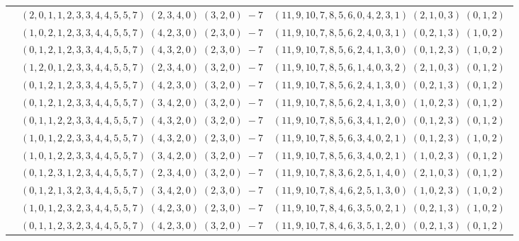 \documentclass[11pt]{article}
\begin{document}
\begin{longtable}[l]{|c|c|c|}
 \cline{2-3} 
 & $(2 ,0 ,1 ,1 ,2 ,3 ,3 ,4 ,4 ,5 ,5 ,7) \;(2 ,3 ,4 ,0) \;(3 ,2 ,0) \;-7$ & $(11 ,9 ,10 ,7 ,8 ,5 ,6 ,0 ,4 ,2 ,3 ,1) \;(2 ,1 ,0 ,3) \;(0 ,1 ,2) \;$\\ 
 \cline{2-3} 
 & $(1 ,0 ,2 ,1 ,2 ,3 ,3 ,4 ,4 ,5 ,5 ,7) \;(4 ,2 ,3 ,0) \;(2 ,3 ,0) \;-7$ & $(11 ,9 ,10 ,7 ,8 ,5 ,6 ,2 ,4 ,0 ,3 ,1) \;(0 ,2 ,1 ,3) \;(1 ,0 ,2) \;$\\ 
 \cline{2-3} 
 & $(0 ,1 ,2 ,1 ,2 ,3 ,3 ,4 ,4 ,5 ,5 ,7) \;(4 ,3 ,2 ,0) \;(2 ,3 ,0) \;-7$ & $(11 ,9 ,10 ,7 ,8 ,5 ,6 ,2 ,4 ,1 ,3 ,0) \;(0 ,1 ,2 ,3) \;(1 ,0 ,2) \;$\\ 
 \cline{2-3} 
 & $(1 ,2 ,0 ,1 ,2 ,3 ,3 ,4 ,4 ,5 ,5 ,7) \;(2 ,3 ,4 ,0) \;(3 ,2 ,0) \;-7$ & $(11 ,9 ,10 ,7 ,8 ,5 ,6 ,1 ,4 ,0 ,3 ,2) \;(2 ,1 ,0 ,3) \;(0 ,1 ,2) \;$\\ 
 \cline{2-3} 
 & $(0 ,1 ,2 ,1 ,2 ,3 ,3 ,4 ,4 ,5 ,5 ,7) \;(4 ,2 ,3 ,0) \;(3 ,2 ,0) \;-7$ & $(11 ,9 ,10 ,7 ,8 ,5 ,6 ,2 ,4 ,1 ,3 ,0) \;(0 ,2 ,1 ,3) \;(0 ,1 ,2) \;$\\ 
 \cline{2-3} 
 & $(0 ,1 ,2 ,1 ,2 ,3 ,3 ,4 ,4 ,5 ,5 ,7) \;(3 ,4 ,2 ,0) \;(3 ,2 ,0) \;-7$ & $(11 ,9 ,10 ,7 ,8 ,5 ,6 ,2 ,4 ,1 ,3 ,0) \;(1 ,0 ,2 ,3) \;(0 ,1 ,2) \;$\\ 
 \cline{2-3} 
 & $(0 ,1 ,1 ,2 ,2 ,3 ,3 ,4 ,4 ,5 ,5 ,7) \;(4 ,3 ,2 ,0) \;(3 ,2 ,0) \;-7$ & $(11 ,9 ,10 ,7 ,8 ,5 ,6 ,3 ,4 ,1 ,2 ,0) \;(0 ,1 ,2 ,3) \;(0 ,1 ,2) \;$\\ 
 \cline{2-3} 
 & $(1 ,0 ,1 ,2 ,2 ,3 ,3 ,4 ,4 ,5 ,5 ,7) \;(4 ,3 ,2 ,0) \;(2 ,3 ,0) \;-7$ & $(11 ,9 ,10 ,7 ,8 ,5 ,6 ,3 ,4 ,0 ,2 ,1) \;(0 ,1 ,2 ,3) \;(1 ,0 ,2) \;$\\ 
 \cline{2-3} 
 & $(1 ,0 ,1 ,2 ,2 ,3 ,3 ,4 ,4 ,5 ,5 ,7) \;(3 ,4 ,2 ,0) \;(3 ,2 ,0) \;-7$ & $(11 ,9 ,10 ,7 ,8 ,5 ,6 ,3 ,4 ,0 ,2 ,1) \;(1 ,0 ,2 ,3) \;(0 ,1 ,2) \;$\\ 
 \cline{2-3} 
 & $(0 ,1 ,2 ,3 ,1 ,2 ,3 ,4 ,4 ,5 ,5 ,7) \;(2 ,3 ,4 ,0) \;(3 ,2 ,0) \;-7$ & $(11 ,9 ,10 ,7 ,8 ,3 ,6 ,2 ,5 ,1 ,4 ,0) \;(2 ,1 ,0 ,3) \;(0 ,1 ,2) \;$\\ 
 \cline{2-3} 
 & $(0 ,1 ,2 ,1 ,3 ,2 ,3 ,4 ,4 ,5 ,5 ,7) \;(3 ,4 ,2 ,0) \;(2 ,3 ,0) \;-7$ & $(11 ,9 ,10 ,7 ,8 ,4 ,6 ,2 ,5 ,1 ,3 ,0) \;(1 ,0 ,2 ,3) \;(1 ,0 ,2) \;$\\ 
 \cline{2-3} 
 & $(1 ,0 ,1 ,2 ,3 ,2 ,3 ,4 ,4 ,5 ,5 ,7) \;(4 ,2 ,3 ,0) \;(2 ,3 ,0) \;-7$ & $(11 ,9 ,10 ,7 ,8 ,4 ,6 ,3 ,5 ,0 ,2 ,1) \;(0 ,2 ,1 ,3) \;(1 ,0 ,2) \;$\\ 
 \cline{2-3} 
 & $(0 ,1 ,1 ,2 ,3 ,2 ,3 ,4 ,4 ,5 ,5 ,7) \;(4 ,2 ,3 ,0) \;(3 ,2 ,0) \;-7$ & $(11 ,9 ,10 ,7 ,8 ,4 ,6 ,3 ,5 ,1 ,2 ,0) \;(0 ,2 ,1 ,3) \;(0 ,1 ,2) \;$\\ 

\end{longtable}
\end{document}

